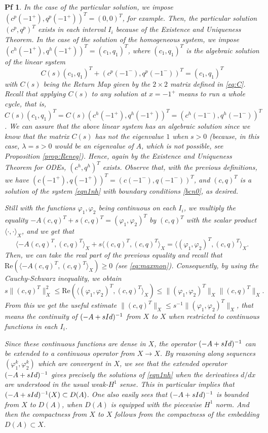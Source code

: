 \documentclass[10pt,a4paper]{amsart}
\newtheorem{pf}{Pf}
\def\Id{\rm{Id}}
\def\Re{{\textrm{Re}}}
\begin{document}
\begin{pf}
In the case of the particular solution, we impose $(c^p(-1^+),q^p(-1^+))^T=(0,0)^T$, for example. Then, the particular solution $(c^p,q^p)^T$ exists in each interval $I_i$ because of the Existence and Uniqueness Theorem. In the case of the solution of the homogeneous system, we impose $(c^h(-1^+),q^h(-1^+))^T=(c_1,q_1)^T$, where $(c_1,q_1)^T$ is the algebraic solution of the linear system
$$C(s)(c_1,q_1)^T+(c^p(-1^-),q^p(-1^-))^T=(c_1,q_1)^T$$
with $C(s)$ being the Return Map given by the $2\times2$ matrix defined in \eqref{eq:C}. Recall that applying $C(s)$ to any solution at $x=-1^+$ means to run a whole cycle, that is,  $C(s)(c_1,q_1)^T =C(s)(c^h(-1^+),q^h(-1^+))^T = (c^h(-1^-),q^h(-1^-))^T$. We can assure that the above linear system has an algebraic solution since we know that the matrix $C(s)$ has not the eigenvalue $1$ when $s>0$ (because, in this case, $\lambda=s>0$ would be an eigenvalue of $A$, which is not possible, see Proposition \ref{prop:Reneg}). Hence, again by the Existence and Uniqueness Theorem for ODEs, $(c^h,q^h)^T$ exists. Observe that, with the previous definitions, we have $(c(-1^+),q(-1^+))^T = (c(-1^-),q(-1^-))^T$, and $(c,q)^T$ is a solution of the system \eqref{eqn1nh} with boundary conditions \eqref{bcn0}, as desired.

Still with the functions $\varphi_1,\varphi_2$ being continuous on each $I_i$,  we multiply the equality $-A(c,q)^T+s(c,q)^T=(\varphi_1,\varphi_2)^T$ by $(c,q)^T$ with the scalar product $\langle\cdot,\cdot\rangle_X$, and we get that
$$\langle-A(c,q)^T,(c,q)^T\rangle_X+s\langle (c,q)^T,(c,q)^T\rangle_X=
\langle (\varphi_1,\varphi_2)^T,(c,q)^T\rangle_X.$$
Then, we can take the real part of the previous equality and recall that $\Re\left(\langle-A(c,q)^T,(c,q)^T\rangle_X\right)\ge 0$ (see \eqref{eq:maxmon}). Consequently, by using the Cauchy-Schwarz inequality, we obtain
$$
s\|(c,q)^T\|_X^2\le \Re\left(\langle (\varphi_1,\varphi_2)^T,(c,q)^T\rangle_X\right)\le\|(\varphi_1,\varphi_2)^T\|_X\|(c,q)^T\|_X.
$$
From this we get the useful estimate $\|(c,q)^T\|_X\le s^{-1}\|(\varphi_1,\varphi_2)^T\|_X$,
that means the continuity of $(-A+s\Id)^{-1}$ from $X$ to $X$ when restricted to continuous functions in each $I_i$.

Since these continuous functions are dense in $X$, the operator $(-A+s\Id)^{-1}$ can be extended to a continuous operator from $X\to X$. By reasoning along sequences $(\varphi_1^{k},\varphi_2^{k})$ which are convergent in $X$, we see that the extended operator $(-A+s\Id)^{-1}$ gives precisely the solutions of \eqref{eqn1nh} when the derivatives ${d}/{dx}$ are understood in the usual weak-$H^1$ sense. This in particular implies that $(-A+s\Id)^{-1}(X)\subset D(A)$. One also easily sees that  $ (-A+s \Id)^{-1}$ is bounded from $X$ to $D(A)$, when $D(A)$ is equipped with the piecewise $H^1$ norm. And then the compactness from $X$ to $X$ follows from the compactness of the embedding $D(A)\subset X$.
\end{pf}
\end{document}
